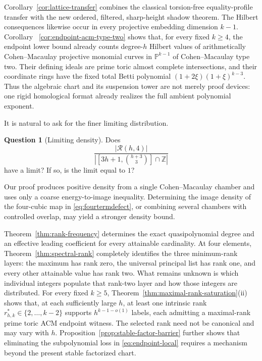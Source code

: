 \documentclass[11pt,reqno]{amsart}
\theoremstyle{definition}
\newtheorem{question}[theorem]{Question}
\theoremstyle{remark}
\newcommand{\Z}{\mathbb Z}
\newcommand{\Rcal}{\mathcal R}
\begin{document}
Corollary~\ref{cor:lattice-transfer} combines the classical torsion-free
equality-profile transfer with the new ordered, filtered, sharp-height shadow
theorem.  The
Hilbert consequences likewise occur in every projective embedding dimension
$k-1$.  Corollary~
\ref{cor:endpoint-acm-type-two} shows that, for every fixed $k\geq4$, the
endpoint lower bound already counts degree-$h$ Hilbert values of
arithmetically Cohen--Macaulay projective monomial curves in
$\mathbb P^{k-1}$ of Cohen--Macaulay type two.  Their defining ideals are
prime toric almost complete intersections, and their coordinate rings have
the fixed total Betti polynomial $(1+2\xi)(1+\xi)^{k-3}$.  Thus the algebraic chart and its
suspension tower are not merely proof devices: one rigid homological format
already realizes the full ambient polynomial exponent.

It is natural to ask for the finer limiting distribution.

\begin{question}[Limiting density]\label{q:density}
Does
\[
 \frac{|\Rcal(h,4)|}
 {|[3h+1,\binom{h+3}{3}]\cap\Z|}
\]
have a limit?  If so, is the limit equal to $1$?
\end{question}

Our proof produces positive density from a single Cohen--Macaulay chamber
and uses only a coarse energy-to-image inequality.  Determining the image
density of the four-cubic map in \eqref{eq:fourtermdefect}, or combining
several chambers with controlled overlap, may yield a stronger density bound.

Theorem~\ref{thm:rank-frequency} determines the exact quasipolynomial degree
and an effective leading coefficient for every attainable cardinality.  At four
elements, Theorem~\ref{thm:spectral-rank} completely identifies the three
minimum-rank layers: the maximum has rank zero, the universal principal list
has rank one, and every other attainable value has rank two.  What remains
unknown is which individual integers populate that rank-two layer and how
those integers are distributed.  For every fixed $k\geq5$,
Theorem~\ref{thm:maximal-rank-saturation}\textup{(ii)} shows that, at each sufficiently large
$h$, at least one intrinsic rank
$r^\ast_{h,k}\in\{2,\ldots,k-2\}$ supports $h^{k-1-o(1)}$ labels, each admitting
a maximal-rank prime toric ACM endpoint witness.  The selected rank need not
be canonical and may vary with $h$.
Proposition~\ref{prop:stable-factor-barrier} further shows that eliminating
the subpolynomial loss in \eqref{eq:endpoint-local} requires a mechanism
beyond the present stable factorized chart.
\end{document}
